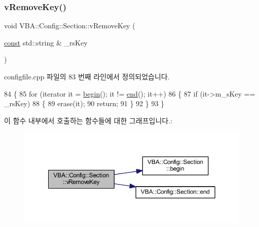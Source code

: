 \subsubsection{\texorpdfstring{v\+Remove\+Key()}{vRemoveKey()}}
{\footnotesize\ttfamily void V\+B\+A\+::\+Config\+::\+Section\+::v\+Remove\+Key (\begin{DoxyParamCaption}\item[{\mbox{\hyperlink{getopt1_8c_a2c212835823e3c54a8ab6d95c652660e}{const}} std\+::string \&}]{\+\_\+rs\+Key }\end{DoxyParamCaption})}



configfile.\+cpp 파일의 83 번째 라인에서 정의되었습니다.


\begin{DoxyCode}
84 \{
85   \textcolor{keywordflow}{for} (iterator it = \mbox{\hyperlink{class_v_b_a_1_1_config_1_1_section_ac345183b43a45fd3eeaa646eac631390}{begin}}(); it != \mbox{\hyperlink{class_v_b_a_1_1_config_1_1_section_a15ff15ecb9f7f3aa0bb1c218d47f8829}{end}}(); it++)
86   \{
87     \textcolor{keywordflow}{if} (it->m\_sKey == \_rsKey)
88     \{
89       erase(it);
90       \textcolor{keywordflow}{return};
91     \}
92   \}
93 \}
\end{DoxyCode}
이 함수 내부에서 호출하는 함수들에 대한 그래프입니다.\+:
\nopagebreak
\begin{figure}[H]
\begin{center}
\leavevmode
\includegraphics[width=350pt]{class_v_b_a_1_1_config_1_1_section_a4634d3e637b664d40ba4d36f859e4573_cgraph}
\end{center}
\end{figure}
\mbox{\label{class_v_b_a_1_1_config_1_1_section_a57e1b95cbea40db71c093381beff4b0e}} 
